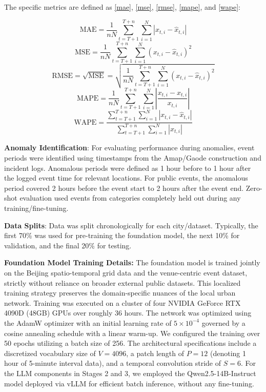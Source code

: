 \documentclass{article}
\begin{document}
The specific metrics are defined as \eqref{mae}, \eqref{mse}, \eqref{rmse}, \eqref{mape}, and \eqref{wape}:

\begin{equation} \label{mae}
\text{MAE} = \frac{1}{nN} \sum_{t=T+1}^{T+n} \sum_{i=1}^{N} |x_{t,i} - \hat{x}_{t,i}|
\end{equation}
\begin{equation} \label{mse}
\text{MSE} = \frac{1}{nN} \sum_{t=T+1}^{T+n} \sum_{i=1}^{N} (x_{t,i} - \hat{x}_{t,i})^2
\end{equation}
\begin{equation} \label{rmse}
\text{RMSE} = \sqrt{\text{MSE}} = \sqrt{ \frac{1}{nN} \sum_{t=T+1}^{T+n} \sum_{i=1}^{N} (x_{t,i} - \hat{x}_{t,i})^2 }
\end{equation}
\begin{equation} \label{mape}
\text{MAPE} = \frac{1}{nN} \sum_{t=T+1}^{T+n} \sum_{i=1}^{N} \left| \frac{x_{t,i} - \hat{x}_{t,i}}{x_{t,i}} \right|
\end{equation}
\begin{equation} \label{wape}
\text{WAPE} = \frac{\sum_{t=T+1}^{T+n} \sum_{i=1}^{N} |x_{t,i} - \hat{x}_{t,i}|}{\sum_{t=T+1}^{T+n} \sum_{i=1}^{N} |x_{t,i}|}
\end{equation}

\textbf{Anomaly Identification}: For evaluating performance during anomalies, event periods were identified using timestamps from the Amap/Gaode construction and incident logs.  Anomalous periods were defined as 1 hour before to 1 hour after the logged event time for relevant locations. For public events, the anomalous period covered 2 hours before the event start to 2 hours after the event end. Zero-shot evaluation used events from categories completely held out during any training/fine-tuning. 

\textbf{Data Splits}: Data was split chronologically for each city/dataset. Typically, the first 70\% was used for pre-training the foundation model, the next 10\% for validation, and the final 20\% for testing.

\textbf{Foundation Model Training Details:} The foundation model is trained jointly on the Beijing spatio-temporal grid data and the venue-centric event dataset, strictly without reliance on broader external public datasets. This localized training strategy preserves the domain-specific nuances of the local urban network. Training was executed on a cluster of four NVIDIA GeForce RTX 4090D (48GB) GPUs over roughly 36 hours. The network was optimized using the AdamW optimizer with an initial learning rate of $5 \times 10^{-4}$ governed by a cosine annealing schedule with a linear warm-up. We configured the training over 50 epochs utilizing a batch size of 256. The architectural specifications include a discretized vocabulary size of $V=4096$, a patch length of $P=12$ (denoting 1 hour of 5-minute interval data), and a temporal convolution stride of $S=6$. For the LLM components in Stages 2 and 3, we employed the Qwen2.5-14B-Instruct model deployed via vLLM for efficient batch inference, without any fine-tuning.
\end{document}
